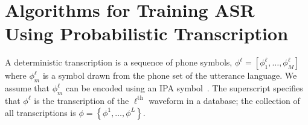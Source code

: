 \section{Algorithms for Training ASR Using Probabilistic Transcription}

A deterministic transcription is a sequence of phone symbols,
$\phi^\ell =[\phi_1^\ell,\ldots,\phi_M^\ell]$ where $\phi_m^\ell$ is a
symbol drawn from the phone set of the utterance language.  We assume
that $\phi_m^\ell$ can be encoded using an IPA symbol~\cite{ipa1993}.
The superscript specifies that $\phi^\ell$ is the transcription of the
$\ell^{\textrm{th}}$ waveform in a database; the collection of all
transcriptions is $\phi=\left\{\phi^1,\ldots,\phi^L\right\}$.

